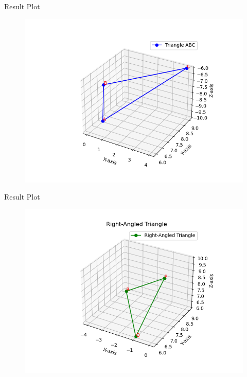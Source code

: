 \documentclass{beamer}
\numberwithin{equation}{section}
\theoremstyle{remark}
\begin{document}
\begin{frame}{Result Plot}
 \begin{figure}[H]
     \centering
     \includegraphics[width=0.8\columnwidth]{figs/fig1.png}
     \caption*{}
     \label{fig:fig1}
 \end{figure}
  
\end{frame}
\begin{frame}{Result Plot}
 \begin{figure}[H]
     \centering
     \includegraphics[width=0.8\columnwidth]{figs/fig2.png}
     \caption*{}
     \label{fig:fig1}
 \end{figure}
  
\end{frame}
\end{document}
